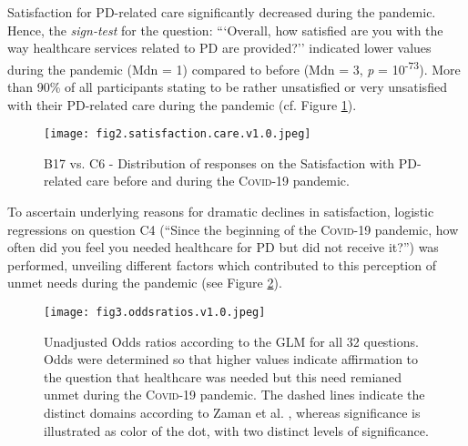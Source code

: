 \documentclass[a4paper,oneside,11pt,english]{scrartcl}
\begin{document}
Satisfaction for \textsc{PD}-related care significantly decreased during the pandemic. Hence, the \textit{sign-test} for the question: ```Overall, how satisfied are you with the way healthcare services related to \textsc{PD} are provided?'' indicated lower values during the pandemic (Mdn = 1) compared to before (Mdn = 3, \textit{p} = 10\textsuperscript{-73}). More than 90\% of all participants stating to be rather unsatisfied or very unsatisfied with their \textsc{PD}-related care during the pandemic (cf. Figure \ref{fig2:satisfaction}). 

\begin{figure}[h!]
\centering
\texttt{[image: fig2.satisfaction.care.v1.0.jpeg]}
\caption{B17 vs. C6 - Distribution of responses on the Satisfaction with PD-related care before and during the \textsc{Covid}-19 pandemic.}
\label{fig2:satisfaction}
\end{figure}

To ascertain underlying reasons for dramatic declines in satisfaction, logistic regressions on question C4 (``Since the beginning of the \textsc{Covid}-19 pandemic, how often did you feel you needed healthcare for \textsc{PD} but did not receive it?'') was performed, unveiling different factors which contributed to this perception of unmet needs during the pandemic (see Figure \ref{fig3:resultsOR1}). 

\begin{figure}[!h]
\centering
\texttt{[image: fig3.oddsratios.v1.0.jpeg]}
\caption{Unadjusted Odds ratios according to the \textsc{GLM} for all 32 questions. Odds were determined so that higher values indicate affirmation to the question that healthcare was needed but this need remianed unmet during the \textsc{Covid}-19 pandemic. The dashed lines indicate the distinct domains according to Zaman et al. \cite{zaman2021barriers}, whereas significance is illustrated as color of the dot, with two distinct levels of significance. }
\label{fig3:resultsOR1}
\end{figure}
\end{document}
